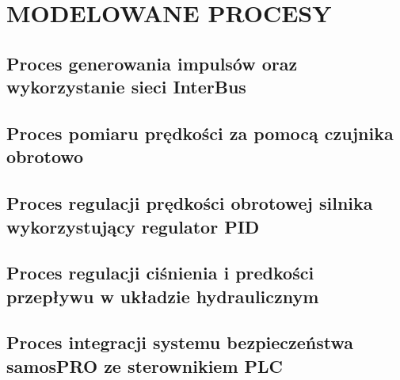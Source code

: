 \chapter{MODELOWANE PROCESY}
\section{Proces generowania impulsów oraz wykorzystanie sieci InterBus}

\section{Proces pomiaru prędkości za pomocą czujnika obrotowo}
\section{Proces regulacji prędkości obrotowej silnika wykorzystujący regulator PID}
\section{Proces regulacji ciśnienia i predkości przepływu w układzie hydraulicznym}
\section{Proces integracji systemu bezpieczeństwa samosPRO ze sterownikiem PLC}
